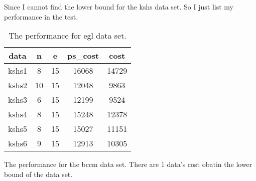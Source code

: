 \documentclass[conference,compsoc]{IEEEtran}
\begin{document}
\begin{appendix}
Since I cannot find the lower bound for the kshs data set. So I just list my performance in the test.

\begin{table}[htbp]
\begin{center}
\begin{tabular}{@{}ccccc@{}}
\toprule
data  & n  & e  & ps\_cost & cost  \\ \midrule
kshs1 & 8  & 15 & 16068    & 14729 \\
kshs2 & 10 & 15 & 12048    & 9863  \\
kshs3 & 6  & 15 & 12199    & 9524  \\
kshs4 & 8  & 15 & 15248    & 12378 \\
kshs5 & 8  & 15 & 15027    & 11151 \\
kshs6 & 9  & 15 & 12913    & 10305 \\ \bottomrule
\end{tabular}
\caption{The performance for egl data set.}
\end{center}
\end{table}

The performance for the bccm data set. There are 1 data's cost obatin the lower bound of the data set.


\end{appendix}
\end{document}
